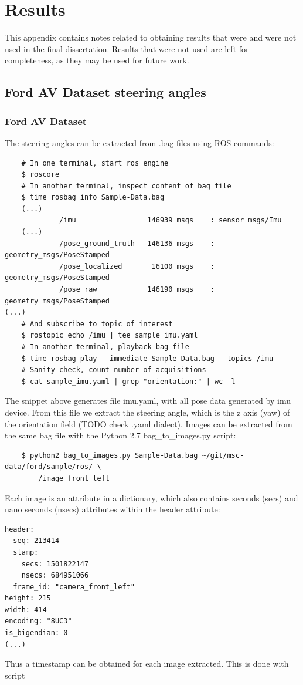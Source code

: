 \chapter{Results} %

This appendix contains notes related to obtaining results that were and were not used in the final dissertation. Results that were not used are left for completeness, as they may be used for future work.

\label{AppendixD} %

\section{Ford AV Dataset steering angles}

\subsection{Ford AV Dataset}

The steering angles can be extracted from .bag files using ROS commands:
\begin{verbatim}
    # In one terminal, start ros engine
    $ roscore
    # In another terminal, inspect content of bag file
    $ time rosbag info Sample-Data.bag
    (...)
             /imu                 146939 msgs    : sensor_msgs/Imu             
    (...)
             /pose_ground_truth   146136 msgs    : geometry_msgs/PoseStamped   
             /pose_localized       16100 msgs    : geometry_msgs/PoseStamped   
             /pose_raw            146190 msgs    : geometry_msgs/PoseStamped   
(...)
    # And subscribe to topic of interest 
    $ rostopic echo /imu | tee sample_imu.yaml
    # In another terminal, playback bag file
    $ time rosbag play --immediate Sample-Data.bag --topics /imu
    # Sanity check, count number of acquisitions
    $ cat sample_imu.yaml | grep "orientation:" | wc -l
\end{verbatim}
The snippet above generates file imu.yaml, with all pose data generated by imu device. From this file we extract the steering angle, which is the z axis (yaw) of the orientation field (TODO check .yaml dialect). 
Images can be extracted from the same bag file with the Python 2.7 bag\_to\_images.py script:
\begin{verbatim}
    $ python2 bag_to_images.py Sample-Data.bag ~/git/msc-data/ford/sample/ros/ \
        /image_front_left
\end{verbatim}
Each image is an attribute in a dictionary, which also contains seconds (secs) and nano seconds (nsecs) attributes within the header attribute:
\begin{verbatim}
header: 
  seq: 213414
  stamp: 
    secs: 1501822147
    nsecs: 684951066
  frame_id: "camera_front_left"
height: 215
width: 414
encoding: "8UC3"
is_bigendian: 0
(...)
\end{verbatim}
Thus a timestamp can be obtained for each image extracted. This is done with script  
  

